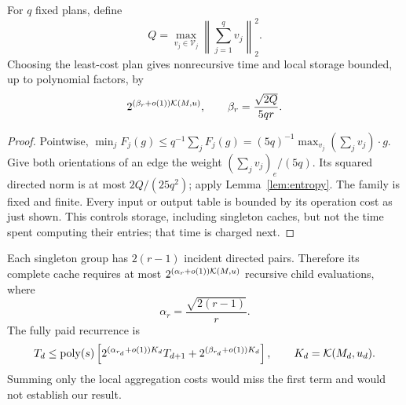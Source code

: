 \begin{lemma}\label{lem:average}
For $q$ fixed plans, define
\[
 Q=\max_{v_j\in\mathcal V_j}\left\|\sum_{j=1}^qv_j\right\|_2^2.
\]
Choosing the least-cost plan gives nonrecursive time and local storage
bounded, up to polynomial factors, by
\[
 2^{(\beta_r+o(1))\mathcal K(M,u)},\qquad
 \beta_r=\frac{\sqrt{2Q}}{5qr}.
\]
\end{lemma}
\begin{proof}
Pointwise,
$\min_jF_j(g)\le q^{-1}\sum_jF_j(g)
=(5q)^{-1}\max_{v_j}(\sum_jv_j)\cdot g$.
Give both orientations of an edge the weight
$(\sum_jv_j)_e/(5q)$. Its squared directed norm is at most
$2Q/(25q^2)$; apply Lemma~\ref{lem:entropy}. The family is fixed and finite.
Every input or output table is bounded by its operation cost as just shown.
This controls storage, including singleton caches, but not the time spent
computing their entries; that time is charged next.
\end{proof}

Each singleton group has $2(r-1)$ incident directed pairs. Therefore its
complete cache requires at most $2^{(\alpha_r+o(1))\mathcal K(M,u)}$ recursive
child evaluations, where
\[
 \alpha_r=\frac{\sqrt{2(r-1)}}r.
\]
The fully paid recurrence is
\begin{equation}
 T_d\le\operatorname{poly}(s)\left[
 2^{(\alpha_{r_d}+o(1))K_d}T_{d+1}
 +2^{(\beta_{r_d}+o(1))K_d}\right],\qquad K_d=\mathcal K(M_d,u_d).
 \label{eq:paid}
\end{equation}
Summing only the local aggregation costs would miss the first term and
would not establish our result.
